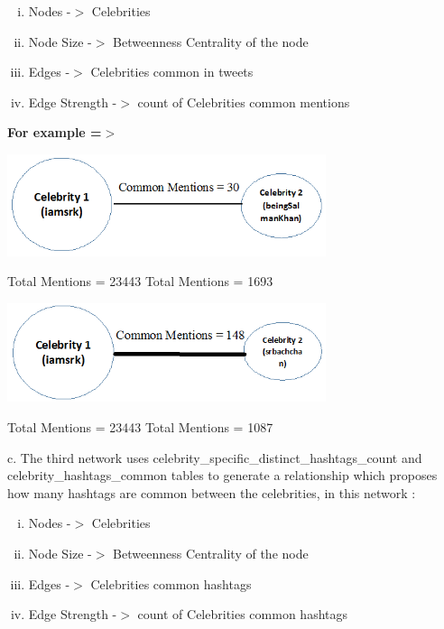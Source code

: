 \documentclass[runningheads,a4paper]{llncs}
\begin{document}
\begin{itemize}
\vspace{0.1in}
\begin{enumerate}[i.  ]
\addtolength{\itemindent}{1cm}
\item Nodes -$>$ Celebrities
\item Node Size -$>$ Betweenness Centrality of the node
\item Edges -$>$ Celebrities common in tweets
\item Edge Strength -$>$ count of Celebrities common mentions
\end{enumerate}
\vspace{0.1in}
\textbf{For example =$>$}
\begin{flushleft}
\centerline{\includegraphics[width=0.7\textwidth,height=0.5\textheight,keepaspectratio]{common_mention_eg_1.png}}
\centerline{Total Mentions = 23443 \hspace{2cm} Total Mentions = 1693}
\vspace{0.2in}
\centerline{\includegraphics[width=0.7\textwidth,height=0.5\textheight,keepaspectratio]{common_mention_eg_2.png}}
\centerline{Total Mentions = 23443 \hspace{2cm} Total Mentions = 1087}
\end{flushleft}
\subitem c. The third network uses celebrity\_specific\_distinct\_hashtags\_count and celebrity\_hashtags\_common tables to generate a relationship which proposes how many hashtags are common between the celebrities, in this network :
\vspace{0.1in}
\begin{enumerate}[i.  ]
\addtolength{\itemindent}{1cm}
\item Nodes -$>$ Celebrities
\item Node Size -$>$ Betweenness Centrality of the node
\item Edges -$>$ Celebrities common hashtags
\item Edge Strength -$>$ count of Celebrities common hashtags

\end{enumerate}
\end{itemize}
\end{document}
